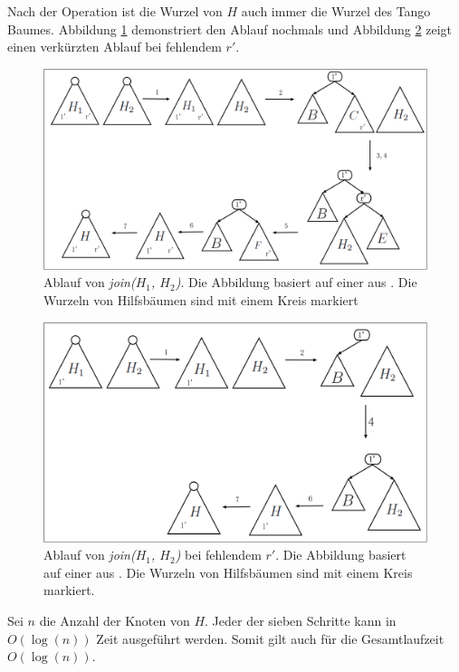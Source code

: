 \documentclass[a4paper,12pt]{article}
\begin{document}
Nach der Operation ist die Wurzel von $H$ auch immer die Wurzel des Tango Baumes. Abbildung \ref{fig:join} demonstriert den Ablauf nochmals und Abbildung \ref{fig:join2} zeigt einen verkürzten Ablauf bei fehlendem $r'$.
\begin{figure}[H]
	\centering
	\includegraphics[width=1\textwidth]{Medien/Tango/join}
	\caption{Ablauf von \textit{join($H_1$, $H_2$)}. Die Abbildung basiert auf einer aus \cite{demainDinamicOpti}. Die Wurzeln von Hilfsbäumen sind mit einem Kreis markiert }
	\label{fig:join}
\end{figure}
\begin{figure}[H]
	\centering
	\includegraphics[width=1\textwidth]{Medien/Tango/join2}
	\caption{Ablauf von  \textit{join($H_1$, $H_2$)} bei fehlendem $r'$. Die Abbildung basiert auf einer aus \cite{demainDinamicOpti}. Die Wurzeln von Hilfsbäumen sind mit einem Kreis markiert. }
	\label{fig:join2}
\end{figure}

\noindent Sei $n$ die Anzahl der Knoten von $H$. Jeder der sieben Schritte kann in $O\left(\log \left(n\right)\right)$ Zeit ausgeführt werden. Somit gilt auch für die Gesamtlaufzeit $O\left(\log \left(n\right)\right)$.
\end{document}
